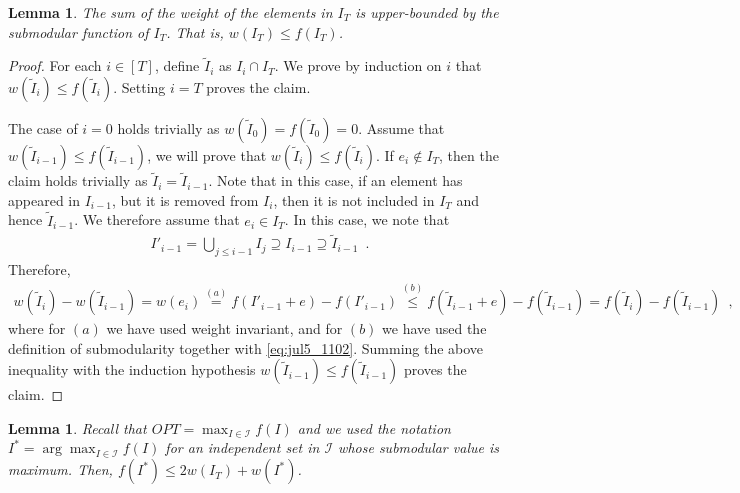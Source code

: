 \documentclass[11pt]{article}
\newtheorem{lemma}[theorem]{Lemma}
\newcommand{\wtilde}{\widetilde}
\newcommand{\marginalgain}[2]{f(#2 + #1) - f(#2)}
\begin{document}
\begin{lemma}
\label{lm:wI_le_fI}
    The sum of the weight of the elements in $I_T$ 
    is upper-bounded by the submodular function of $I_T$.  
    That is, $w(I_T) \le f(I_T)$. 
\end{lemma}

\begin{proof}
  For each $i \in [T]$, define
  $\wtilde{I}_i$ as
  $I_i \cap I_T$. We prove by induction on $i$ that
  $w(\wtilde{I}_i) \le f(\wtilde{I}_i)$. 
  Setting $i=T$ proves the claim.
  
  The case of $i=0$ holds trivially as
  $w(\wtilde{I}_0) = f(\wtilde{I}_0) = 0$.
  Assume that $w(\wtilde{I}_{i-1}) \le f(\wtilde{I}_{i-1})$,
  we will prove that $w(\wtilde{I}_i) \le f(\wtilde{I}_i)$.
  If $e_i \notin I_T$, then the claim holds trivially as
  $\wtilde{I}_{i} = \wtilde{I}_{i-1}$. Note that in this case, if an element has appeared in $I_{i-1}$, but it is removed from $I_i$, then it is not included in $I_T$ and hence $\wtilde{I}_{i-1}$. We therefore assume that $e_i \in I_T$. In this case,
  we note that
  \begin{align}
    \label{eq:jul5_1102}
      I'_{i-1} = \bigcup_{j \le i-1} I_{j} 
      \supseteq I_{i-1} \supseteq \wtilde{I}_{i-1} \enspace .
  \end{align}
  Therefore, 
  \begin{align*}
      w(\wtilde{I}_{i}) - w(\wtilde{I}_{i-1})
      =
      w(e_i) \overset{(a)}{=}
      \marginalgain{e}{I'_{i-1}}
      \overset{(b)}{\le}
      \marginalgain{e}{\wtilde{I}_{i-1}} = f(\wtilde{I}_i) - f(\wtilde{I}_{i-1}) \enspace,
  \end{align*}
  where for $(a)$ we have used weight invariant, and for $(b)$ we have used the definition of submodularity together with \eqref{eq:jul5_1102}.
  Summing the above inequality with the induction hypothesis
  $w(\wtilde{I}_{i-1}) \le f(\wtilde{I}_{i-1})$ proves the claim.    
\end{proof}




\begin{lemma}
\label{lm:fIstar_2fI_wI}
 Recall that $OPT = \max_{I \in \mathcal{I}} f(I)$ and we 
 used the notation $I^* = \arg\max_{I \in \mathcal{I}} f(I) $ 
 for an independent set in $\mathcal{I}$ whose submodular value is maximum. 
Then, $f(I^*) \le 2w(I_T) + w(I^*)$.
\end{lemma}
\end{document}
